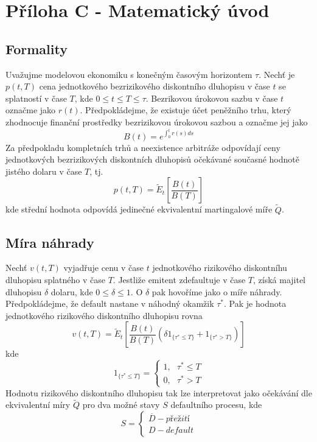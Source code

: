 \section{Příloha C - Matematický úvod}

\subsection{Formality}

Uvažujme modelovou ekonomiku s konečným časovým horizontem $\tau$. Nechť je $p(t,T)$ cena jednotkového bezrizikového diskontního dluhopisu v čase $t$ se splatností v čase $T$, kde $0 \le t \le T \le \tau$. Bezrikovou úrokovou sazbu v čase $t$ označme jako $r(t)$. Předpokládejme, že existuje účet peněžního trhu, který zhodnocuje finanční prostředky bezrizikovou úrokovou sazbou a označme jej jako
\begin{equation}
B(t) = e^{\int_0^t r(s)ds}
\end{equation}
Za předpokladu kompletních trhů a neexistence arbitráže odpovídají ceny jednotkových bezrizikových diskontních dluhopisů očekávané současné hodnotě jistého dolaru v čase $T$, tj.
\begin{equation}
p(t,T) = \tilde{E}_t\left[\frac{B(t)}{B(T)}\right]
\end{equation}
kde střední hodnota odpovídá jedinečné ekvivalentní martingalové míře $\tilde{Q}$.

\subsection{Míra náhrady}

Nechť $v(t,T)$ vyjadřuje cenu v čase $t$ jednotkového rizikového diskontníhu dluhopisu splatného v čase $T$. Jestliže emitent zdefaultuje v čase $T$, získá majitel dluhopisu $\delta$ dolaru, kde $0 \le \delta \le 1$. O $\delta$ pak hovoříme jako o míře náhrady. Předpokládejme, že default nastane v náhodný okamžik $\tau^*$. Pak je hodnota jednotkového rizikového diskontního dluhopisu rovna
\begin{equation}
v(t,T) = \tilde{E}_t\left[\frac{B(t)}{B(T)}\left(\delta1_{\{\tau^* \le T\}} + 1_{\{\tau^* > T\}}\right)\right]
\end{equation}
kde
\begin{equation}
1_{\{\tau^* \le T\}} =
\begin{cases}
1, ~~~ \tau^* \le T\\
0, ~~~ \tau^* > T
\end{cases}
\end{equation}
Hodnotu rizikového diskontního dluhopisu tak lze interpretovat jako očekávání dle ekvivalentní míry $\tilde{Q}$ pro dva možné stavy $S$ defaultního procesu, kde
\begin{equation}
S =
\begin{cases}
\overline{D} - \textit{přežití}\\
D - \textit{default}
\end{cases}
\end{equation}

